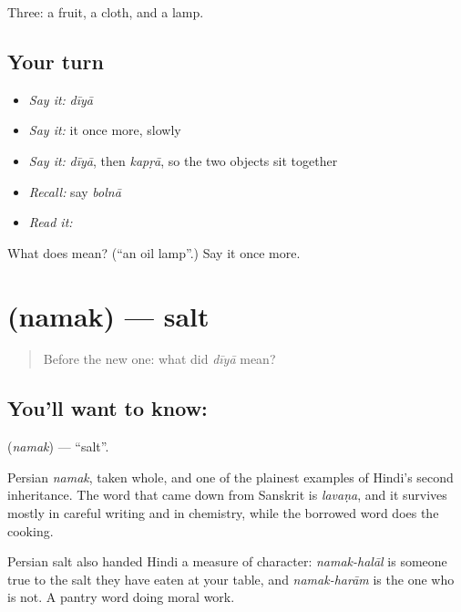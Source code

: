 \begin{grammarlens}[title={What you've built}]
Three: a fruit, a cloth, and a lamp.
\end{grammarlens}

\subsection*{Your turn}
\begin{itemize}
\raggedright
  \item \emph{Say it:} \emph{dīyā}
  \item \emph{Say it:} it once more, slowly
  \item \emph{Say it:} \emph{dīyā}, then \emph{kapṛā}, so the two objects sit together
  \item \emph{Recall:} say \emph{bolnā}
  \item \emph{Read it:} \textbf{}
\end{itemize}

\begin{tcolorbox}[breakable,colback=teal!4,colframe=teal!35!black,title={Before you move on}]
What does  mean? (\textquotedblleft{}an oil lamp\textquotedblright{}.) Say it once more.
\end{tcolorbox}
\section[\texorpdfstring{\hi{नमक} (namak)}{नमक (namak)}]{ (namak) — salt}

\label{lesson:HI-C45-salt}



\begin{quote}
Before the new one: what did \emph{dīyā} mean?
\end{quote}

\subsection*{You'll want to know: }
\textbf{} (\emph{namak}) — \textquotedblleft{}salt\textquotedblright{}.

Persian \emph{namak}, taken whole, and one of the plainest examples of Hindi's second inheritance. The word that came down from Sanskrit is \emph{lavaṇa}, and it survives mostly in careful writing and in chemistry, while the borrowed word does the cooking.

Persian salt also handed Hindi a measure of character: \emph{namak-halāl} is someone true to the salt they have eaten at your table, and \emph{namak-harām} is the one who is not. A pantry word doing moral work.

